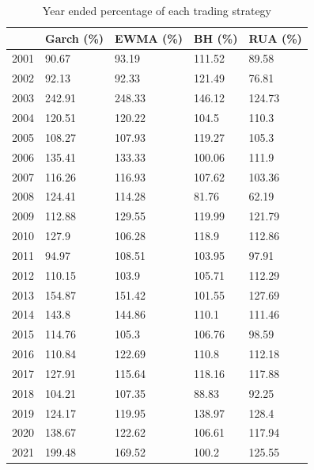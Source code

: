 \documentclass[11pt,a4paper]{article}
\begin{document}
    \begin{table}[H]
    \centering
    \begin{tabular}{lllll}
    \hline
                              & Garch (\%) & EWMA (\%) & BH (\%) & RUA (\%) \\ \hline
    \multicolumn{1}{l|}{2001} & 90.67      & 93.19    & 111.52 & 89.58   \\
    \multicolumn{1}{l|}{2002} & 92.13      & 92.33    & 121.49 & 76.81   \\
    \multicolumn{1}{l|}{2003} & 242.91     & 248.33   & 146.12 & 124.73  \\
    \multicolumn{1}{l|}{2004} & 120.51     & 120.22   & 104.5  & 110.3   \\
    \multicolumn{1}{l|}{2005} & 108.27     & 107.93   & 119.27 & 105.3   \\
    \multicolumn{1}{l|}{2006} & 135.41     & 133.33   & 100.06 & 111.9   \\
    \multicolumn{1}{l|}{2007} & 116.26     & 116.93   & 107.62 & 103.36  \\
    \multicolumn{1}{l|}{2008} & 124.41     & 114.28   & 81.76  & 62.19   \\
    \multicolumn{1}{l|}{2009} & 112.88     & 129.55   & 119.99 & 121.79  \\
    \multicolumn{1}{l|}{2010} & 127.9      & 106.28   & 118.9  & 112.86  \\
    \multicolumn{1}{l|}{2011} & 94.97      & 108.51   & 103.95 & 97.91   \\
    \multicolumn{1}{l|}{2012} & 110.15     & 103.9    & 105.71 & 112.29  \\
    \multicolumn{1}{l|}{2013} & 154.87     & 151.42   & 101.55 & 127.69  \\
    \multicolumn{1}{l|}{2014} & 143.8      & 144.86   & 110.1  & 111.46  \\
    \multicolumn{1}{l|}{2015} & 114.76     & 105.3    & 106.76 & 98.59   \\
    \multicolumn{1}{l|}{2016} & 110.84     & 122.69   & 110.8  & 112.18  \\
    \multicolumn{1}{l|}{2017} & 127.91     & 115.64   & 118.16 & 117.88  \\
    \multicolumn{1}{l|}{2018} & 104.21     & 107.35   & 88.83  & 92.25   \\
    \multicolumn{1}{l|}{2019} & 124.17     & 119.95   & 138.97 & 128.4   \\
    \multicolumn{1}{l|}{2020} & 138.67     & 122.62   & 106.61 & 117.94  \\
    \multicolumn{1}{l|}{2021} & 199.48     & 169.52   & 100.2  & 125.55  \\ \hline
    \end{tabular}
    \caption{Year ended percentage of each trading strategy}
    \label{tab:1}
    \end{table}
    
\end{document}
